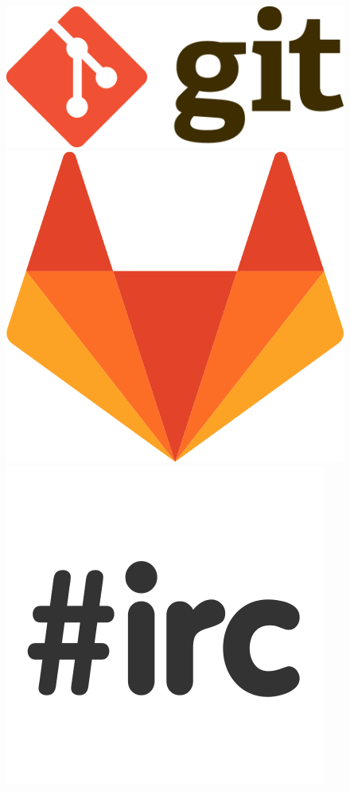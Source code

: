 \documentclass{beamer}
\begin{document}
\begin{frame}
\begin{columns}
\begin{figure}
      \includegraphics[scale=0.03]{images/git-logo.png}
      \hspace{0.1cm} \includegraphics[scale=0.03]{images/gitlab.png} \\
      \includegraphics[scale=0.07]{images/irc-logo.png}
    \end{figure}
  \end{columns}


\end{frame}
\end{document}
